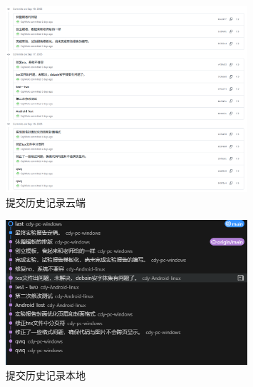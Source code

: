 \documentclass[12pt,a4paper]{article}
\begin{document}
    \begin{figure}[H]
    \centering
    \includegraphics[width=0.8\textwidth]{last.png}
    \caption{提交历史记录云端}
    \end{figure}
    \begin{figure}[H]
    \centering
    \includegraphics[width=0.8\textwidth]{last2.png}
    \caption{提交历史记录本地}
    \end{figure}
\end{document}
